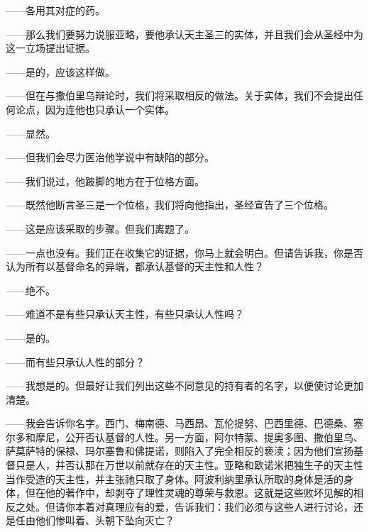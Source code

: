 ——各用其对症的药。\par

——那么我们要努力说服亚略，要他承认天主圣三的实体，并且我们会从圣经中为这一立场提出证据。\par

——是的，应该这样做。\par

——但在与撒伯里乌辩论时，我们将采取相反的做法。关于实体，我们不会提出任何论点，因为连他也只承认一个实体。\par

——显然。\par

——但我们会尽力医治他学说中有缺陷的部分。\par

——我们说过，他跛脚的地方在于位格方面。\par

——既然他断言圣三是一个位格，我们将向他指出，圣经宣告了三个位格。\par

——这是应该采取的步骤。但我们离题了。\par

——一点也没有。我们正在收集它的证据，你马上就会明白。但请告诉我，你是否认为所有以基督命名的异端，都承认基督的天主性和人性？\par

——绝不。\par

——难道不是有些只承认天主性，有些只承认人性吗？\par

——是的。\par

——而有些只承认人性的部分？\par

——我想是的。但最好让我们列出这些不同意见的持有者的名字，以便使讨论更加清楚。\par

——我会告诉你名字。西门、梅南德、马西昂、瓦伦提努、巴西里德、巴德桑、塞尔多和摩尼，公开否认基督的人性。另一方面，阿尔特蒙、提奥多图、撒伯里乌、萨莫萨特的保禄、玛尔塞鲁和佛提诺，则陷入了完全相反的亵渎；因为他们宣扬基督只是人，并否认那在万世以前就存在的天主性。亚略和欧诺米把独生子的天主性当作受造的天主性，并主张祂只取了身体。阿波利纳里承认所取的身体是活的身体，但在他的著作中，却剥夺了理性灵魂的尊荣与救恩。这就是这些败坏见解的相反之处。但请你本着对真理应有的爱，告诉我们：我们必须与这些人进行讨论，还是任由他们惨叫着、头朝下坠向灭亡？\par

